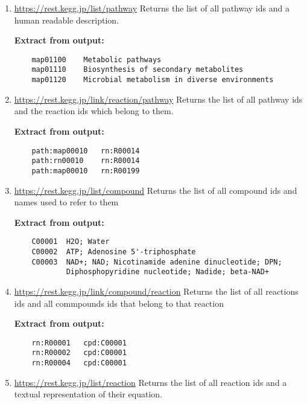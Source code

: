 \begin{enumerate}
    \item \href{https://rest.kegg.jp/list/pathway}{https://rest.kegg.jp/list/pathway} Returns the list of all pathway ids and a human readable description.
    \begin{framed}
        \textbf{Extract from output:}
    \begin{verbatim}
    map01100	Metabolic pathways
    map01110	Biosynthesis of secondary metabolites
    map01120	Microbial metabolism in diverse environments
        \end{verbatim}
    \end{framed}
    \item \href{https://rest.kegg.jp/link/reaction/pathway}{https://rest.kegg.jp/link/reaction/pathway} Returns the list of all pathway ids and the reaction ids which belong to them.
    \begin{framed}
        \textbf{Extract from output:}
    \begin{verbatim}
    path:map00010	rn:R00014
    path:rn00010	rn:R00014
    path:map00010	rn:R00199
        \end{verbatim}
    \end{framed}
    \item \href{https://rest.kegg.jp/list/compound}{https://rest.kegg.jp/list/compound} Returns the list of all compound ids and names used to refer to them
    \begin{framed}
        \textbf{Extract from output:}
        \begin{verbatim}
    C00001	H2O; Water
    C00002	ATP; Adenosine 5'-triphosphate
    C00003	NAD+; NAD; Nicotinamide adenine dinucleotide; DPN; 
            Diphosphopyridine nucleotide; Nadide; beta-NAD+
        \end{verbatim}
    \end{framed}
    \item \href{https://rest.kegg.jp/link/compound/reaction}{https://rest.kegg.jp/link/compound/reaction} Returns the list of all reactions ids and all commpounds ids that belong to that reaction
    \begin{framed}
        \textbf{Extract from output:}
        \begin{verbatim}
    rn:R00001	cpd:C00001
    rn:R00002	cpd:C00001
    rn:R00004	cpd:C00001
        \end{verbatim}
    \end{framed}
    \item \href{https://rest.kegg.jp/list/reaction}{https://rest.kegg.jp/list/reaction} Returns the list of all reaction ids and a textual representation of their equation.

\end{enumerate}
